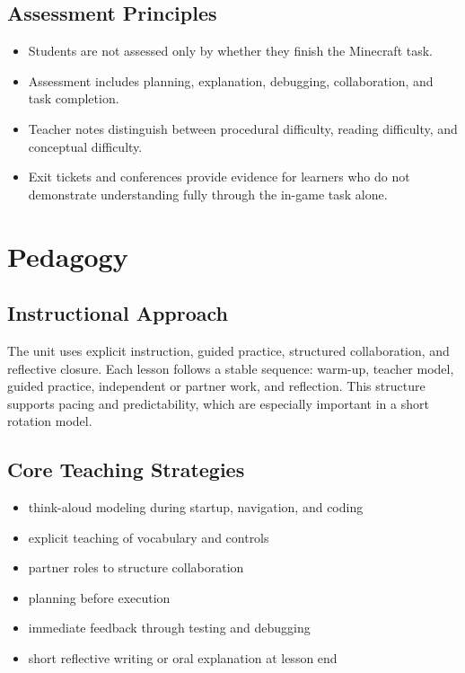 \documentclass[12pt]{article}
\begin{document}
\subsection{Assessment Principles}

\begin{assessbox}
\begin{itemize}
\item Students are not assessed only by whether they finish the Minecraft task.
\item Assessment includes planning, explanation, debugging, collaboration, and task completion.
\item Teacher notes distinguish between procedural difficulty, reading difficulty, and conceptual difficulty.
\item Exit tickets and conferences provide evidence for learners who do not demonstrate understanding fully through the in-game task alone.
\end{itemize}
\end{assessbox}


\newpage
\section{Pedagogy}

\subsection{Instructional Approach}

The unit uses explicit instruction, guided practice, structured collaboration, and reflective closure. Each lesson follows a stable sequence: warm-up, teacher model, guided practice, independent or partner work, and reflection. This structure supports pacing and predictability, which are especially important in a short rotation model.

\subsection{Core Teaching Strategies}

\begin{itemize}
\item think-aloud modeling during startup, navigation, and coding
\item explicit teaching of vocabulary and controls
\item partner roles to structure collaboration
\item planning before execution
\item immediate feedback through testing and debugging
\item short reflective writing or oral explanation at lesson end
\end{itemize}
\end{document}

